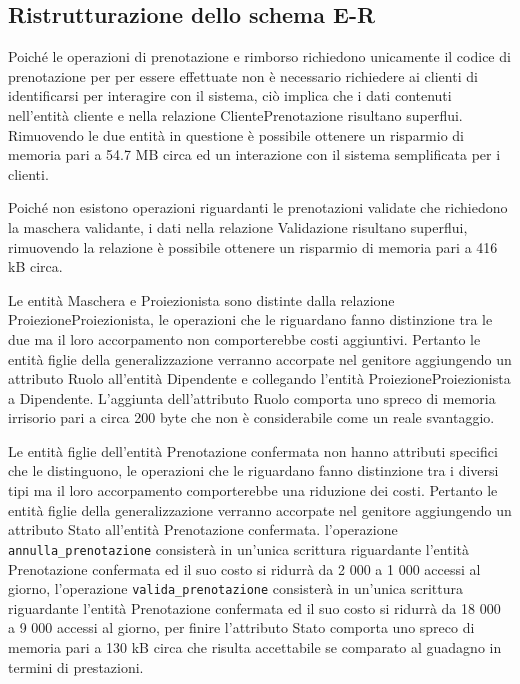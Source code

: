 \pagebreak
\subsection*{Ristrutturazione dello schema E-R}
%
%

Poiché le operazioni di prenotazione e rimborso richiedono unicamente il codice
di prenotazione per per essere effettuate non è necessario richiedere ai clienti
di identificarsi per interagire con il sistema, ciò implica che i dati
contenuti nell'entità cliente e nella relazione ClientePrenotazione risultano
superflui. Rimuovendo le due entità in questione è possibile ottenere un
risparmio di memoria pari a %
54.7 MB circa ed un interazione con il sistema semplificata per i clienti.

Poiché non esistono operazioni riguardanti le prenotazioni validate che
richiedono la maschera validante, i dati nella relazione Validazione risultano
superflui, rimuovendo la relazione è possibile ottenere un risparmio di memoria
pari a %
416 kB circa.

Le entità Maschera e Proiezionista sono distinte dalla relazione
ProiezioneProiezionista, le operazioni che le riguardano fanno distinzione tra
le due ma il loro accorpamento non comporterebbe costi aggiuntivi.
Pertanto le entità figlie della generalizzazione verranno accorpate nel
genitore aggiungendo un attributo Ruolo all'entità Dipendente e collegando
l'entità ProiezioneProiezionista a Dipendente.
L'aggiunta dell'attributo Ruolo comporta uno spreco di memoria irrisorio pari a
circa 200 byte che non è considerabile come un reale svantaggio.


Le entità figlie dell'entità Prenotazione confermata non hanno attributi
specifici che le distinguono, le operazioni che le riguardano fanno distinzione
tra i diversi tipi ma il loro accorpamento comporterebbe una riduzione dei
costi.
Pertanto le entità figlie della generalizzazione verranno accorpate nel
genitore aggiungendo un attributo Stato all'entità Prenotazione confermata.
l'operazione \verb|annulla_prenotazione| consisterà in un'unica scrittura
riguardante l'entità Prenotazione confermata ed il suo costo si ridurrà da
2 000 a 1 000 accessi al giorno,
l'operazione \verb|valida_prenotazione| consisterà in un'unica scrittura
riguardante l'entità Prenotazione confermata ed il suo costo si ridurrà da
18 000 a 9 000 accessi al giorno,
per finire l'attributo Stato comporta uno spreco di memoria pari a
130 kB circa che risulta accettabile se comparato al guadagno in termini di
prestazioni.

